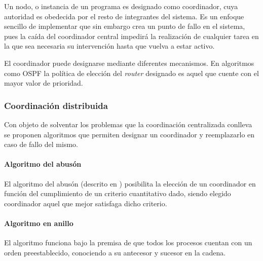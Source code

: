 Un nodo, o instancia de un programa es designado como coordinador, cuya autoridad es obedecida por el resto de integrantes del sistema. Es un enfoque sencillo de implementar que sin embargo crea un punto de fallo en el sistema, pues la caída del coordinador central impedirá la realización de cualquier tarea en la que sea necesaria su intervención hasta que vuelva a estar activo.

El coordinador puede designarse mediante diferentes mecanismos. En algoritmos como OSPF\cite{rfc2328} la política de elección del \textit{router} designado es aquel que cuente con el mayor valor de prioridad.

\subsubsection{Coordinación distribuida}

Con objeto de solventar los problemas que la coordinación centralizada conlleva se proponen algoritmos que permiten designar un coordinador y reemplazarlo en caso de fallo del mismo.

\paragraph{Algoritmo del abusón}

El algoritmo del abusón (descrito en \cite{Coulouris:2011:DSC:2029110:Ch15}) posibilita la elección de un coordinador en función del cumplimiento de un criterio cuantitativo dado, siendo elegido coordinador aquel que mejor satisfaga dicho criterio.

\paragraph{Algoritmo en anillo}

El algoritmo funciona bajo la premisa de que todos los procesos cuentan con un orden preestablecido, conociendo a su antecesor y sucesor en la cadena\cite{Tanenbaum:2006:DSP:1202502:Ch6}.



